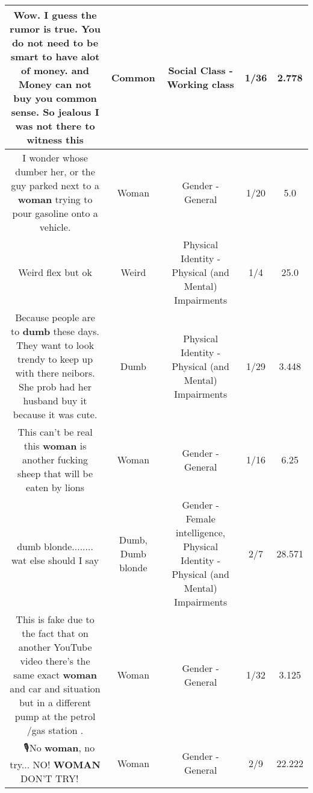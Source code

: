 \documentclass[11pt]{article}
\newlength\mylength
\begin{document}
\begin{center}
\begin{longtable}{|C{.65\mylength}|C{.30\mylength}|C{.12\mylength}|C{.12\mylength}|C{.12\mylength}|}
  \small Wow. I guess the rumor is true. You do not need to be smart to have alot of money. and Money can not buy you \textbf{common} sense. So jealous I was not there to witness this\normalsize   & Common & Social Class - Working class & 1/36 & 2.778 \\  \hline
  \small I wonder whose dumber her, or the guy parked next to a \textbf{woman} trying to pour gasoline onto a vehicle.\normalsize   & Woman & Gender - General & 1/20 & 5.0 \\  \hline
  \small Weird flex but ok\normalsize   & Weird & Physical Identity - Physical (and Mental) Impairments & 1/4 & 25.0 \\  \hline
  \small Because people are to \textbf{dumb} these days.  They want to look trendy to keep up with there neibors.  She prob had her husband buy it because it was cute.\normalsize   & Dumb & Physical Identity - Physical (and Mental) Impairments & 1/29 & 3.448 \\  \hline
  \small This can't be real this \textbf{woman} is another fucking sheep that will be eaten by lions\normalsize   & Woman & Gender - General & 1/16 & 6.25 \\  \hline
  \small dumb blonde........ wat else should I say\normalsize   & Dumb, Dumb blonde & Gender - Female intelligence, Physical Identity - Physical (and Mental) Impairments & 2/7 & 28.571 \\  \hline
  \small This is fake due to the fact that on another YouTube video there's the same exact \textbf{woman} and car and situation but in a different pump at the petrol /gas station .\normalsize   & Woman & Gender - General & 1/32 & 3.125 \\  \hline
  \small 🎼🎵🎶🎙No \textbf{woman}, no try... NO! \textbf{WOMAN} DON'T TRY! 🎵🎶🎵\normalsize   & Woman & Gender - General & 2/9 & 22.222 \\  \hline

\end{longtable}
\end{center}
\end{document}
